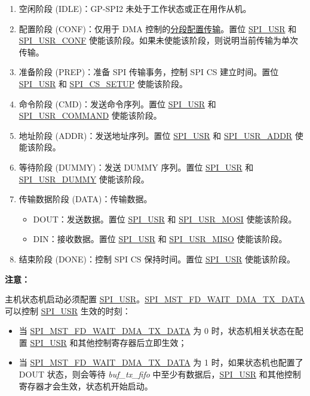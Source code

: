 \documentclass[main\_\_CN.tex]{subfiles}
\begin{document}
\begin{enumerate}
    \item 空闲阶段 (IDLE)：GP-SPI2 未处于工作状态或正在用作从机。
    \item 配置阶段 (CONF)：仅用于 DMA 控制的\hyperref[sec:gp-spi-dma-seg-conf-trans]{分段配置传输}。置位 \hyperref[fielddesc:SPIUSR]{SPI\_USR} 和 \hyperref[fielddesc:SPIUSRCONF]{SPI\_USR\_CONF} 使能该阶段。如果未使能该阶段，则说明当前传输为单次传输。 
    \item 准备阶段 (PREP)：准备 SPI 传输事务，控制 SPI CS 建立时间。置位 \hyperref[fielddesc:SPIUSR]{SPI\_USR} 和 \hyperref[fielddesc:SPICSSETUP]{SPI\_CS\_SETUP} 使能该阶段。 
    \item\label{phase:cmd} 命令阶段 (CMD)：发送命令序列。置位 \hyperref[fielddesc:SPIUSR]{SPI\_USR} 和 \hyperref[fielddesc:SPIUSRCOMMAND]{SPI\_USR\_COMMAND} 使能该阶段。 
    \item\label{phase:addr} 地址阶段 (ADDR)：发送地址序列。置位 \hyperref[fielddesc:SPIUSR]{SPI\_USR} 和 \hyperref[fielddesc:SPIUSRADDR]{SPI\_USR\_ADDR} 使能该阶段。 
    \item 等待阶段 (DUMMY)：发送 DUMMY 序列。置位 \hyperref[fielddesc:SPIUSR]{SPI\_USR} 和 \hyperref[fielddesc:SPIUSRDUMMY]{SPI\_USR\_DUMMY} 使能该阶段。 
    \item\label{phase:data} 传输数据阶段 (DATA)：传输数据。
    \begin{itemize}
    \item DOUT：发送数据。置位 \hyperref[fielddesc:SPIUSR]{SPI\_USR} 和 \hyperref[fielddesc:SPIUSRMOSI]{SPI\_USR\_MOSI} 使能该阶段。 
    \item DIN：接收数据。置位 \hyperref[fielddesc:SPIUSR]{SPI\_USR} 和 \hyperref[fielddesc:SPIUSRMISO]{SPI\_USR\_MISO} 使能该阶段。 
    \end{itemize}
    \item 结束阶段 (DONE)：控制 SPI CS 保持时间。置位 \hyperref[fielddesc:SPIUSR]{SPI\_USR} 使能该阶段。 
\end{enumerate}

\textbf{注意：\\}

主机状态机启动必须配置 \hyperref[fielddesc:SPIUSR]{SPI\_USR}。\hyperref[fielddesc:SPIMSTFDWAITDMATXDATA]{SPI\_MST\_FD\_WAIT\_DMA\_TX\_DATA} 可以控制 \hyperref[fielddesc:SPIUSR]{SPI\_USR} 生效的时刻：
\begin{itemize}
    \item 当 \hyperref[fielddesc:SPIMSTFDWAITDMATXDATA]{SPI\_MST\_FD\_WAIT\_DMA\_TX\_DATA} 为 0 时，状态机相关状态在配置 \hyperref[fielddesc:SPIUSR]{SPI\_USR} 和其他控制寄存器后立即生效；
    \item 当 \hyperref[fielddesc:SPIMSTFDWAITDMATXDATA]{SPI\_MST\_FD\_WAIT\_DMA\_TX\_DATA} 为 1 时，如果状态机也配置了 DOUT 状态，则会等待 \emph{buf\_tx\_fifo} 中至少有数据后，\hyperref[fielddesc:SPIUSR]{SPI\_USR} 和其他控制寄存器才会生效，状态机开始启动。
\end{itemize}
\end{document}
